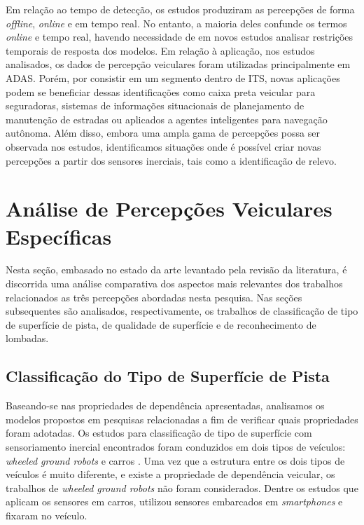 Em relação ao tempo de detecção, os estudos produziram as percepções de forma \textit{offline}, \textit{online} e em tempo real. No entanto, a maioria deles confunde os termos \textit{online} e tempo real, havendo necessidade de em novos estudos analisar restrições temporais de resposta dos modelos. Em relação à aplicação, nos estudos analisados, os dados de percepção veiculares foram utilizadas principalmente em ADAS. Porém, por consistir em um segmento dentro de ITS, novas aplicações podem se beneficiar dessas identificações como caixa preta veicular para seguradoras, sistemas de informações situacionais de planejamento de manutenção de estradas ou aplicados a agentes inteligentes para navegação autônoma. Além disso, embora uma ampla gama de percepções possa ser observada nos estudos, identificamos situações onde é possível criar novas percepções a partir dos sensores inerciais, tais como a identificação de relevo.

\section{Análise de Percepções Veiculares Específicas}

Nesta seção, embasado no estado da arte levantado pela revisão da literatura, é discorrida uma análise comparativa dos aspectos mais relevantes dos trabalhos relacionados  as três percepções abordadas nesta pesquisa. Nas seções subsequentes são analisados, respectivamente, os trabalhos de classificação de tipo de superfície de pista, de qualidade de superfície e de reconhecimento de lombadas.

\subsection{Classificação do Tipo de Superfície de Pista}

Baseando-se nas propriedades de dependência apresentadas, analisamos os modelos propostos em pesquisas relacionadas a fim de verificar quais propriedades foram adotadas. Os estudos para classificação de tipo de superfície com sensoriamento inercial encontrados foram conduzidos em dois tipos de veículos: \textit{wheeled ground robots} \cite{Khaleghian2017, Sebastian2019, Tolentino-Rabelo2016} e carros \cite{Souza2018, Wang2018_1, Wang2017}. Uma vez que a estrutura entre os dois tipos de veículos é muito diferente, e existe a propriedade de dependência veicular, os trabalhos de \textit{wheeled ground robots} não foram considerados. Dentre os estudos que aplicam os sensores em carros, \cite{Souza2018} utilizou sensores embarcados em \textit{smartphones} e \cite{Wang2018_1, Wang2017} fixaram no veículo. 

